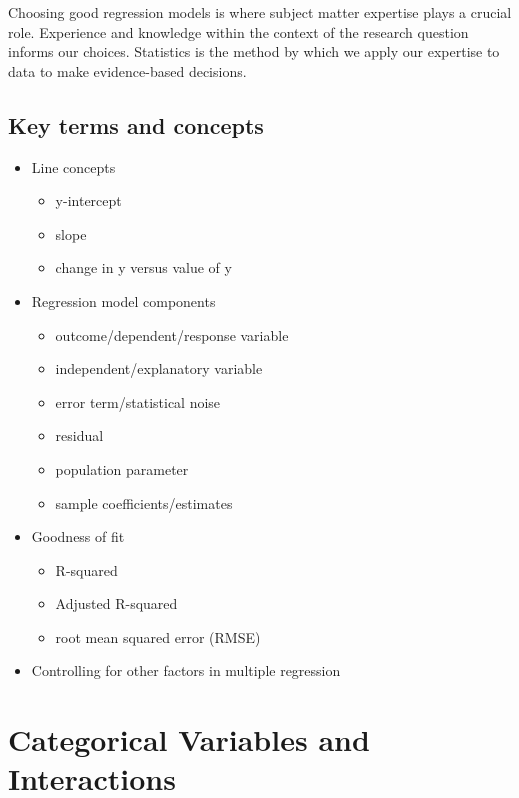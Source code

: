 \documentclass[
]{book}
\providecommand{\tightlist}{%
  \setlength{\itemsep}{0pt}\setlength{\parskip}{0pt}}
\begin{document}
Choosing good regression models is where subject matter expertise plays a crucial role. Experience and knowledge within the context of the research question informs our choices. Statistics is the method by which we apply our expertise to data to make evidence-based decisions.

\hypertarget{kt6}{%
\section{Key terms and concepts}\label{kt6}}

\begin{itemize}
\tightlist
\item
  Line concepts

  \begin{itemize}
  \tightlist
  \item
    y-intercept
  \item
    slope
  \item
    change in y versus value of y
  \end{itemize}
\item
  Regression model components

  \begin{itemize}
  \tightlist
  \item
    outcome/dependent/response variable
  \item
    independent/explanatory variable
  \item
    error term/statistical noise
  \item
    residual
  \item
    population parameter
  \item
    sample coefficients/estimates
  \end{itemize}
\item
  Goodness of fit

  \begin{itemize}
  \tightlist
  \item
    R-squared
  \item
    Adjusted R-squared
  \item
    root mean squared error (RMSE)
  \end{itemize}
\item
  Controlling for other factors in multiple regression
\end{itemize}

\hypertarget{categorical-variables-and-interactions}{%
\chapter{Categorical Variables and Interactions}\label{categorical-variables-and-interactions}}
\end{document}
